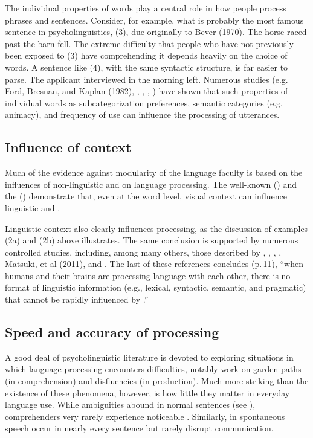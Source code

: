 \documentclass[a4paper]{article}
\begin{document}
The individual properties of words play a central role in how people process phrases and sentences.  Consider, for example, what is probably the most famous sentence in psycholinguistics, (3), due originally to Bever (1970).
\ea
The horse raced past the barn fell.
\z
The extreme difficulty that people who have not previously been exposed to (3) have comprehending it depends heavily on the choice of words.  A sentence like (4), with the same syntactic structure, is far easier to parse.
\ea
The applicant interviewed in the morning left.
\z
Numerous studies (e.g. Ford, Bresnan, and Kaplan (1982), \citet{TrueswellEtal93}, \citet{MPS94a-u}, \citet{BresnanEtal2007}, \citet{WasowEtal2011}) have shown that such properties of individual words as subcategorization preferences, semantic categories (e.g. animacy), and frequency of use can influence the processing of utterances.  

\subsection{Influence of context}

Much of the evidence against modularity of the language faculty is based on the influences of non-linguistic  and  on language processing.  The well-known (\citet{McGurkMacDonald76}) and the  (\citet{Stroop35}) demonstrate that, even at the word level, visual context can influence linguistic  and .

Linguistic context also clearly influences processing, as the discussion of examples (2a) and (2b) above illustrates.  The same conclusion is supported by numerous controlled studies, including,
among many others, those described by \citet{CS85a}, \citet{AltmannSteedman88}, \citet{Branigan2007}, \citet{Tooley2007a}, Matsuki, et al (2011), and \citet{SpevackEtal2018}.  The last of these references concludes (p.\,11), ``when humans and their brains are processing language with each other, there is no format of linguistic information (e.g., lexical, syntactic, semantic, and pragmatic) that cannot be rapidly
influenced by .''

\subsection{Speed and accuracy of processing}

A good deal of psycholinguistic literature is devoted to exploring situations in which language processing encounters difficulties, notably work on garden paths (in comprehension) and disfluencies (in production).  Much more striking than the existence of these phenomena, however, is how little they matter in everyday language use.  While ambiguities abound in normal sentences (see \citet{Wasow2015}), comprehenders very rarely experience noticeable .  Similarly,  in spontaneous speech occur in nearly every sentence but rarely disrupt communication.  
\end{document}
